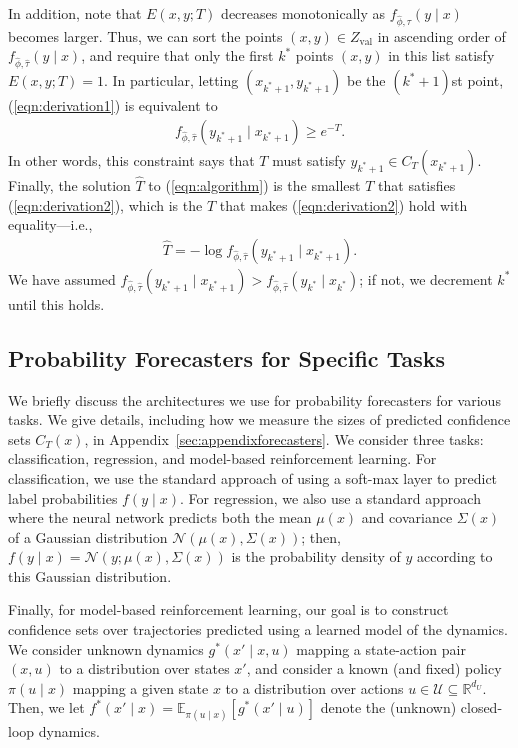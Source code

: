 \documentclass{article} \usepackage{iclr2020_conference,times}
\renewcommand{\(}						{\left(}
\renewcommand{\)}						{\right)}
\renewcommand{\[}						{\left[}
\renewcommand{\]}						{\right]}
\newcommand{\<}						{\left<}
\renewcommand{\>}						{\right>}
\begin{document}
In addition, note that $E(x,y;T)$ decreases monotonically as $f_{\hat{\phi},\hat{\tau}}(y\mid x)$ becomes larger. Thus, we can sort the points $(x,y)\in Z_{\text{val}}$ in ascending order of $f_{\hat{\phi},\hat{\tau}}(y\mid x)$, and require that only the first $k^*$ points $(x,y)$ in this list satisfy $E(x,y;T)=1$. In particular, letting $(x_{k^*+1},y_{k^*+1})$ be the $(k^*+1)$st point, (\ref{eqn:derivation1}) is equivalent to
\begin{align}
\label{eqn:derivation2}
f_{\hat{\phi},\hat{\tau}}(y_{k^*+1}\mid x_{k^*+1})\ge e^{-T}.
\end{align}
In other words, this constraint says that $T$ must satisfy $y_{k^*+1}\in C_T(x_{k^*+1})$. Finally, the solution $\hat{T}$ to (\ref{eqn:algorithm}) is the smallest $T$ that satisfies (\ref{eqn:derivation2}), which is the $T$ that makes (\ref{eqn:derivation2}) hold with equality---i.e.,
\begin{align}
\hat{T}=-\log f_{\hat{\phi},\hat{\tau}}(y_{k^*+1}\mid x_{k^*+1}).
\end{align}
We have assumed $f_{\hat{\phi},\hat{\tau}}(y_{k^*+1}\mid x_{k^*+1})>f_{\hat{\phi},\hat{\tau}}(y_{k^*}\mid x_{k^*})$; if not, we decrement $k^*$ until this holds.

\subsection{Probability Forecasters for Specific Tasks}
\label{sec:instances}

We briefly discuss the architectures we use for probability forecasters for various tasks. We give details, including how we measure the sizes of predicted confidence sets $C_T(x)$, in Appendix~\ref{sec:appendixforecasters}. We consider three tasks: classification, regression, and model-based reinforcement learning. For classification, we use the standard approach of using a soft-max layer to predict label probabilities $f(y\mid x)$. For regression, we also use a standard approach where the neural network predicts both the mean $\mu(x)$ and covariance $\Sigma(x)$ of a Gaussian distribution $\mathcal{N}(\mu(x),\Sigma(x))$; then, $f(y\mid x)=\mathcal{N}(y;\mu(x),\Sigma(x))$ is the probability density of $y$ according to this Gaussian distribution.

Finally, for model-based reinforcement learning, our goal is to construct confidence sets over trajectories predicted using a learned model of the dynamics. We consider unknown dynamics $g^*(x'\mid x,u)$ mapping a state-action pair $(x,u)$ to a distribution over states $x'$, and consider a known (and fixed) policy $\pi(u\mid x)$ mapping a given state $x$ to a distribution over actions $u\in\mathcal{U}\subseteq\mathbb{R}^{d_U}$. Then, we let $f^*(x'\mid x)=\mathbb{E}_{\pi(u\mid x)}[g^*(x'\mid u)]$ denote the (unknown) closed-loop dynamics.
\end{document}
